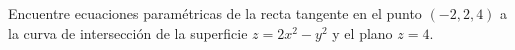 \item Encuentre ecuaciones paramétricas de la recta tangente en el punto $(-2, 2, 4)$ a la curva de intersección de la superficie $z = 2x^2 - y^2$ y el plano $z = 4$.

